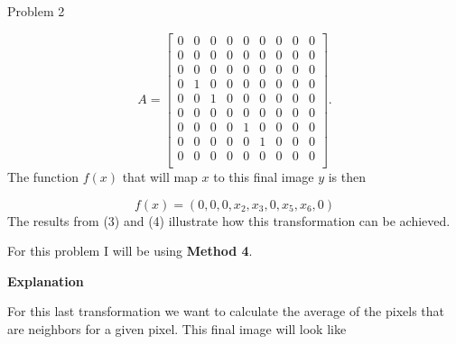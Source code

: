 \begin{problem}{Problem 2}
\begin{highlight}
        \begin{equation}
            A =
            \begin{bmatrix}
                0 & 0 & 0 & 0 & 0 & 0 & 0 & 0 & 0 \\
                0 & 0 & 0 & 0 & 0 & 0 & 0 & 0 & 0 \\
                0 & 0 & 0 & 0 & 0 & 0 & 0 & 0 & 0 \\
                0 & 1 & 0 & 0 & 0 & 0 & 0 & 0 & 0 \\
                0 & 0 & 1 & 0 & 0 & 0 & 0 & 0 & 0 \\
                0 & 0 & 0 & 0 & 0 & 0 & 0 & 0 & 0 \\
                0 & 0 & 0 & 0 & 1 & 0 & 0 & 0 & 0 \\
                0 & 0 & 0 & 0 & 0 & 1 & 0 & 0 & 0 \\
                0 & 0 & 0 & 0 & 0 & 0 & 0 & 0 & 0 \\
            \end{bmatrix}.
        \end{equation}
        The function $f(x)$ that will map $x$ to this final image $y$ is then

        \begin{equation}
            f(x) = (0,0,0,x_{2},x_{3},0,x_{5},x_{6},0)
        \end{equation}
        The results from (3) and (4) illustrate how this transformation can be achieved.
    \end{highlight}

    \begin{highlight}
        For this problem I will be using \textbf{Method 4}. \vspace*{1em}

        \noindent \textbf{Explanation} \vspace*{1em}

        For this last transformation we want to calculate the average of the pixels that are neighbors for a given pixel. This final image will look like


\end{highlight}
\end{problem}

